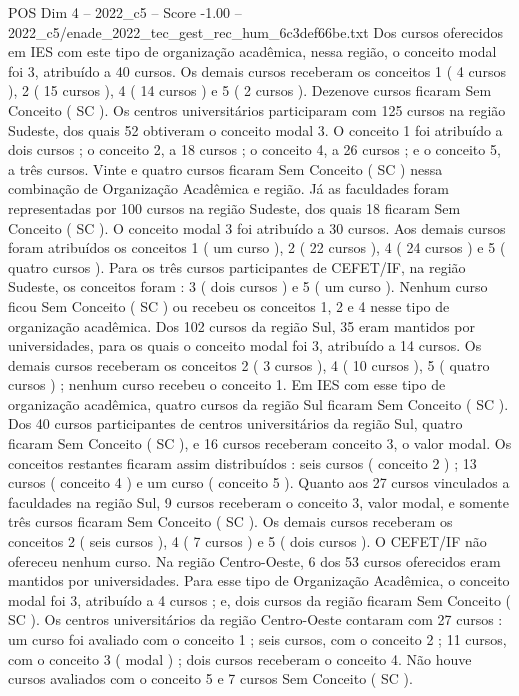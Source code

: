 \begin{textsample}{POS Dim 4 – 2022\_c5 – Score -1.00 – 2022\_c5/enade\_2022\_tec\_gest\_rec\_hum\_6c3def66be.txt}
Dos cursos oferecidos em IES com este tipo de organização acadêmica, nessa região, o conceito modal foi 3, atribuído a 40 cursos.
Os demais cursos receberam os conceitos 1 ( 4 cursos ), 2 ( 15 cursos ), 4 ( 14 cursos ) e 5 ( 2 cursos ).
Dezenove cursos ficaram Sem Conceito ( SC ).
Os centros universitários participaram com 125 cursos na região Sudeste, dos quais 52 obtiveram o conceito modal 3.
O conceito 1 foi atribuído a dois cursos ; o conceito 2, a 18 cursos ; o conceito 4, a 26 cursos ; e o conceito 5, a três cursos.
Vinte e quatro cursos ficaram Sem Conceito ( SC ) nessa combinação de Organização Acadêmica e região.
Já as faculdades foram representadas por 100 cursos na região Sudeste, dos quais 18 ficaram Sem Conceito ( SC ).
O conceito modal 3 foi atribuído a 30 cursos.
Aos demais cursos foram atribuídos os conceitos 1 ( um curso ), 2 ( 22 cursos ), 4 ( 24 cursos ) e 5 ( quatro cursos ).
Para os três cursos participantes de CEFET/IF, na região Sudeste, os conceitos foram : 3 ( dois cursos ) e 5 ( um curso ).
Nenhum curso ficou Sem Conceito ( SC ) ou recebeu os conceitos 1, 2 e 4 nesse tipo de organização acadêmica.
Dos 102 cursos da região Sul, 35 eram mantidos por universidades, para os quais o conceito modal foi 3, atribuído a 14 cursos.
Os demais cursos receberam os conceitos 2 ( 3 cursos ), 4 ( 10 cursos ), 5 ( quatro cursos ) ; nenhum curso recebeu o conceito 1.
Em IES com esse tipo de organização acadêmica, quatro cursos da região Sul ficaram Sem Conceito ( SC ).
Dos 40 cursos participantes de centros universitários da região Sul, quatro ficaram Sem Conceito ( SC ), e 16 cursos receberam conceito 3, o valor modal.
Os conceitos restantes ficaram assim distribuídos : seis cursos ( conceito 2 ) ; 13 cursos ( conceito 4 ) e um curso ( conceito 5 ).
Quanto aos 27 cursos vinculados a faculdades na região Sul, 9 cursos receberam o conceito 3, valor modal, e somente três cursos ficaram Sem Conceito ( SC ).
Os demais cursos receberam os conceitos 2 ( seis cursos ), 4 ( 7 cursos ) e 5 ( dois cursos ).
O CEFET/IF não ofereceu nenhum curso.
Na região Centro-Oeste, 6 dos 53 cursos oferecidos eram mantidos por universidades.
Para esse tipo de Organização Acadêmica, o conceito modal foi 3, atribuído a 4 cursos ; e, dois cursos da região ficaram Sem Conceito ( SC ).
Os centros universitários da região Centro-Oeste contaram com 27 cursos : um curso foi avaliado com o conceito 1 ; seis cursos, com o conceito 2 ; 11 cursos, com o conceito 3 ( modal ) ; dois cursos receberam o conceito 4.
Não houve cursos avaliados com o conceito 5 e 7 cursos Sem Conceito ( SC ).

\end{textsample}
